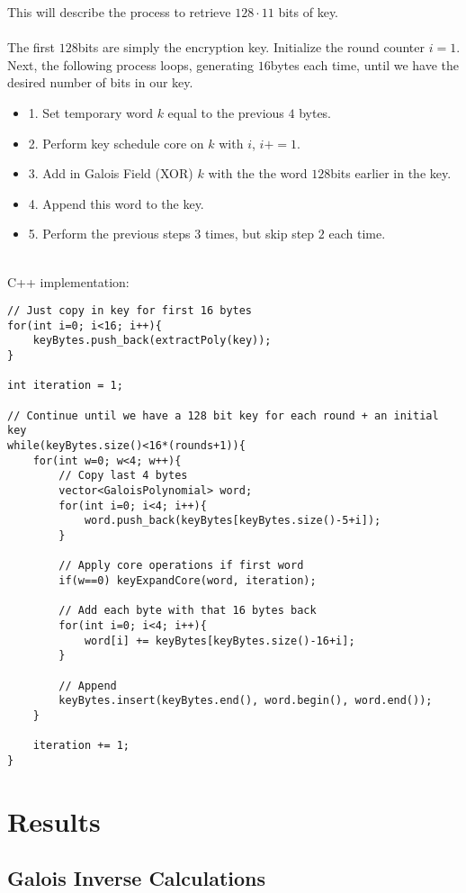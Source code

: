\documentclass{article}
\begin{document}
This will describe the process to retrieve $128\cdot 11$ bits of key.\\\\
The first $128$bits are simply the encryption key. Initialize the round counter $i=1$.\\
Next, the following process loops, generating $16$bytes each time, until we have the desired number of bits in our key.
\begin{itemize}
\item 1. Set temporary word $k$ equal to the previous $4$ bytes.
\item 2. Perform key schedule core on $k$ with $i$, $i+=1$.
\item 3. Add in Galois Field (XOR) $k$ with the the word $128$bits earlier in the key.
\item 4. Append this word to the key.
\item 5. Perform the previous steps $3$ times, but skip step $2$ each time.
\end{itemize}
\hfill\\
C++ implementation:
\begin{lstlisting}
// Just copy in key for first 16 bytes
for(int i=0; i<16; i++){
    keyBytes.push_back(extractPoly(key));
}

int iteration = 1;

// Continue until we have a 128 bit key for each round + an initial key
while(keyBytes.size()<16*(rounds+1)){
    for(int w=0; w<4; w++){
        // Copy last 4 bytes
        vector<GaloisPolynomial> word;
        for(int i=0; i<4; i++){
            word.push_back(keyBytes[keyBytes.size()-5+i]);
        }
        
        // Apply core operations if first word
        if(w==0) keyExpandCore(word, iteration);
        
        // Add each byte with that 16 bytes back
        for(int i=0; i<4; i++){
            word[i] += keyBytes[keyBytes.size()-16+i];
        }
        
        // Append
        keyBytes.insert(keyBytes.end(), word.begin(), word.end());
    }
    
    iteration += 1;
}
\end{lstlisting}

\section{Results}

\subsection{Galois Inverse Calculations}
\end{document}
